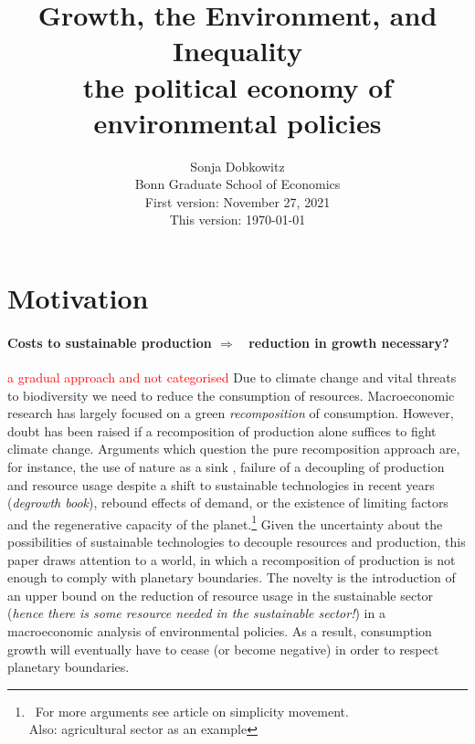 \documentclass[12pt]{article}
\title{Growth, the Environment, and Inequality\\ \small{the political economy of environmental policies}}
\date{Sonja Dobkowitz\\ Bonn Graduate School of Economics\\ %
\vspace{1mm}
First version: November 27, 2021\\
This version: \today }
\newcommand{\ar}{$\Rightarrow$ \ }
\newcommand{\tr}[1]{\textcolor{red}{#1}}
\begin{document}
%	
	\maketitle
	
\section{Motivation}

\paragraph{Costs to sustainable production \ar reduction in growth necessary?}
\tr{a gradual approach and not categorised}
Due to climate change and vital threats to biodiversity we need to reduce the consumption of resources. %
Macroeconomic research has largely focused on a green \textit{recomposition} of consumption. However, doubt has been raised if a recomposition of production alone suffices to fight climate change. 
Arguments which question the pure recomposition approach are, for instance, the use of nature as a sink \citep{Dasgupta2021}, failure of a decoupling of production and resource usage despite a  shift to sustainable technologies in recent years (\textit{degrowth book}), rebound effects of demand, or the existence of limiting factors  and the regenerative capacity of the planet.\footnote{\ For more arguments see article on simplicity movement.\\ Also: agricultural sector as an example}
Given the uncertainty about the possibilities of sustainable technologies to decouple resources and production, this paper draws attention to a world, in which a recomposition of production is not enough to comply with  planetary boundaries. 
The novelty is the introduction of an upper bound on the reduction of resource usage in the sustainable sector (\textit{hence there is some resource needed in the sustainable sector!}) in a macroeconomic analysis of environmental policies. %
As a result, consumption growth will eventually have to cease (or become negative) in order to respect planetary boundaries. %
\end{document}
